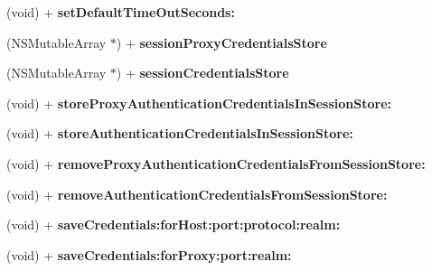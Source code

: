 \begin{DoxyCompactItemize}
\item 
\hypertarget{interface_a_s_i_h_t_t_p_request_a0137fc16c7556f93a0278fa24ea5e85e}{
(void) + {\bfseries set\-Default\-Time\-Out\-Seconds\-:}}
\label{interface_a_s_i_h_t_t_p_request_a0137fc16c7556f93a0278fa24ea5e85e}

\item 
\hypertarget{interface_a_s_i_h_t_t_p_request_a6afdbd6d28c19e6a7f9ef6d0cf8b746a}{
(\-N\-S\-Mutable\-Array $\ast$) + {\bfseries session\-Proxy\-Credentials\-Store}}
\label{interface_a_s_i_h_t_t_p_request_a6afdbd6d28c19e6a7f9ef6d0cf8b746a}

\item 
\hypertarget{interface_a_s_i_h_t_t_p_request_ad6bf65e22787790d6781f7c091c9e2d0}{
(\-N\-S\-Mutable\-Array $\ast$) + {\bfseries session\-Credentials\-Store}}
\label{interface_a_s_i_h_t_t_p_request_ad6bf65e22787790d6781f7c091c9e2d0}

\item 
\hypertarget{interface_a_s_i_h_t_t_p_request_a3b4a0286f50236a836d6321946aa2050}{
(void) + {\bfseries store\-Proxy\-Authentication\-Credentials\-In\-Session\-Store\-:}}
\label{interface_a_s_i_h_t_t_p_request_a3b4a0286f50236a836d6321946aa2050}

\item 
\hypertarget{interface_a_s_i_h_t_t_p_request_a29a3e43083c8878d4f789b4e2bc9b0bb}{
(void) + {\bfseries store\-Authentication\-Credentials\-In\-Session\-Store\-:}}
\label{interface_a_s_i_h_t_t_p_request_a29a3e43083c8878d4f789b4e2bc9b0bb}

\item 
\hypertarget{interface_a_s_i_h_t_t_p_request_a129c7d20fcf78c1a2038aed3690eceb6}{
(void) + {\bfseries remove\-Proxy\-Authentication\-Credentials\-From\-Session\-Store\-:}}
\label{interface_a_s_i_h_t_t_p_request_a129c7d20fcf78c1a2038aed3690eceb6}

\item 
\hypertarget{interface_a_s_i_h_t_t_p_request_ac04306801de4f656b5afafa252096af0}{
(void) + {\bfseries remove\-Authentication\-Credentials\-From\-Session\-Store\-:}}
\label{interface_a_s_i_h_t_t_p_request_ac04306801de4f656b5afafa252096af0}

\item 
\hypertarget{interface_a_s_i_h_t_t_p_request_a9b1885aade1179e0d49cad69d8c15abe}{
(void) + {\bfseries save\-Credentials\-:for\-Host\-:port\-:protocol\-:realm\-:}}
\label{interface_a_s_i_h_t_t_p_request_a9b1885aade1179e0d49cad69d8c15abe}

\item 
\hypertarget{interface_a_s_i_h_t_t_p_request_a12962e3fa0356a77478a1aac1f2d2def}{
(void) + {\bfseries save\-Credentials\-:for\-Proxy\-:port\-:realm\-:}}
\label{interface_a_s_i_h_t_t_p_request_a12962e3fa0356a77478a1aac1f2d2def}


\end{DoxyCompactItemize}
